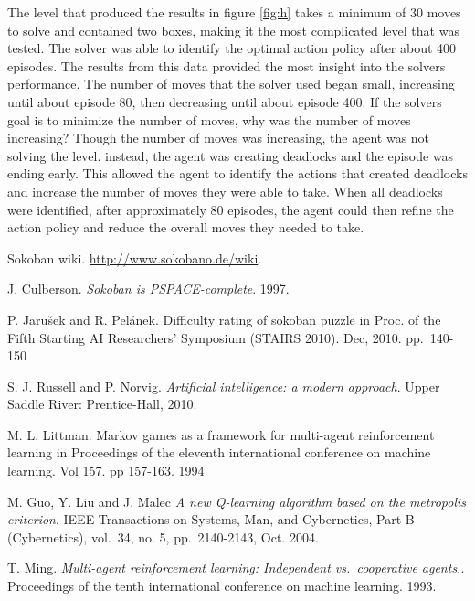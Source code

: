 \documentclass[times, 10pt,twocolumn]{article}
\begin{document}
The level that produced the results in figure \ref{fig:h} takes a minimum of 30 moves to solve and contained two boxes, making it the most complicated level that was tested. The solver was able to identify the optimal action policy after about 400 episodes. The results from this data provided the most insight into the solvers performance. The number of moves that the solver used began small, increasing until about episode 80, then decreasing until about episode 400. If the solvers goal is to minimize the number of moves, why was the number of moves increasing? Though the number of moves was increasing, the agent was not solving the level. instead, the agent was creating deadlocks and the episode was ending early. This allowed the agent to identify the actions that created deadlocks and increase the number of moves they were able to take. When all deadlocks were identified, after approximately 80 episodes, the agent could then refine the action policy and reduce the overall moves they needed to take.






\begin{thebibliography}{9}
Sokoban wiki.
\url{http://www.sokobano.de/wiki}.


J. Culberson. 
\textit{Sokoban is PSPACE-complete}.
1997.

P. Jarušek and R. Pelánek.
Difficulty rating of sokoban puzzle
in Proc. of the Fifth Starting AI Researchers' Symposium (STAIRS 2010).
Dec, 2010. pp.~140-150

S. J. Russell and P. Norvig.
\textit{Artificial intelligence: a modern approach}.
Upper Saddle River: Prentice-Hall, 2010.

M. L. Littman.
Markov games as a framework for multi-agent
reinforcement learning in Proceedings of the eleventh international
conference on machine learning. Vol 157. pp 157-163. 1994

M. Guo, Y. Liu and J. Malec
\textit{A new Q-learning algorithm based on the metropolis criterion}.
IEEE Transactions on Systems, Man, and Cybernetics, Part B (Cybernetics), vol.~34, no. 5, pp.~2140-2143, Oct. 2004.

T. Ming.
\textit{Multi-agent reinforcement learning: Independent vs.~cooperative agents.}.
Proceedings of the tenth international conference on machine learning. 1993.

\end{thebibliography}
\end{document}
